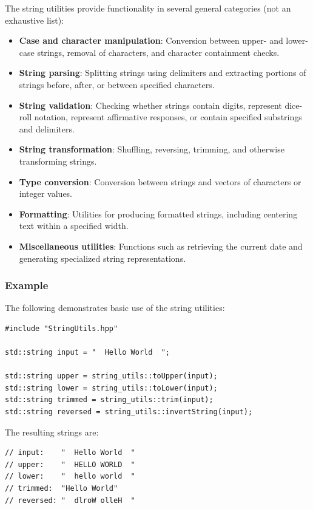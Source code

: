 The string utilities provide functionality in several general categories (not an exhaustive list):
\begin{itemize}
	\item \textbf{Case and character manipulation}: Conversion between upper- and lower-case strings, removal of characters, and character containment checks.

	\item \textbf{String parsing}: Splitting strings using delimiters and extracting portions of strings before, after, or between specified characters.

	\item \textbf{String validation}:  Checking whether strings contain digits, represent dice-roll notation, represent affirmative responses, or contain specified substrings and delimiters.

	\item \textbf{String transformation}: Shuffling, reversing, trimming, and otherwise transforming strings.

	\item \textbf{Type conversion}: Conversion between strings and vectors of characters or integer values.

	\item \textbf{Formatting}: Utilities for producing formatted strings, including centering text within a specified width.

	\item \textbf{Miscellaneous utilities}: Functions such as retrieving the current date and generating specialized string representations.
\end{itemize}

\subsubsection{Example}

The following demonstrates basic use of the string utilities:

\begin{lstlisting}[style=cppstyle]
#include "StringUtils.hpp"

std::string input = "  Hello World  ";

std::string upper = string_utils::toUpper(input);
std::string lower = string_utils::toLower(input);
std::string trimmed = string_utils::trim(input);
std::string reversed = string_utils::invertString(input);
\end{lstlisting}
The resulting strings are:
\begin{lstlisting}[style=cppstyle]
// input:    "  Hello World  "
// upper:    "  HELLO WORLD  "
// lower:    "  hello world  "
// trimmed:  "Hello World"
// reversed: "  dlroW olleH  "
\end{lstlisting}




